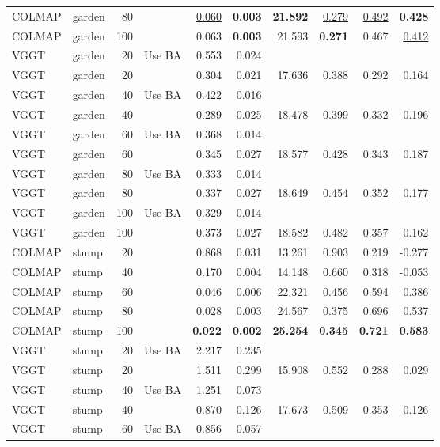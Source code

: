 \begin{table}[H]
\begin{tabular}{llrlrrrrrr}
COLMAP & garden & 80 &  & \underline{0.060} & \textbf{0.003} & \textbf{21.892} & \underline{0.279} & \underline{0.492} & \textbf{0.428} \\
COLMAP & garden & 100 &  & 0.063 & \textbf{0.003} & 21.593 & \textbf{0.271} & 0.467 & \underline{0.412} \\
VGGT & garden & 20 & Use BA & 0.553 & 0.024 &  &  &  &  \\
VGGT & garden & 20 &  & 0.304 & 0.021 & 17.636 & 0.388 & 0.292 & 0.164 \\
VGGT & garden & 40 & Use BA & 0.422 & 0.016 &  &  &  &  \\
VGGT & garden & 40 &  & 0.289 & 0.025 & 18.478 & 0.399 & 0.332 & 0.196 \\
VGGT & garden & 60 & Use BA & 0.368 & 0.014 &  &  &  &  \\
VGGT & garden & 60 &  & 0.345 & 0.027 & 18.577 & 0.428 & 0.343 & 0.187 \\
VGGT & garden & 80 & Use BA & 0.333 & 0.014 &  &  &  &  \\
VGGT & garden & 80 &  & 0.337 & 0.027 & 18.649 & 0.454 & 0.352 & 0.177 \\
VGGT & garden & 100 & Use BA & 0.329 & 0.014 &  &  &  &  \\
VGGT & garden & 100 &  & 0.373 & 0.027 & 18.582 & 0.482 & 0.357 & 0.162 \\
\midrule
COLMAP & stump & 20 &  & 0.868 & 0.031 & 13.261 & 0.903 & 0.219 & -0.277 \\
COLMAP & stump & 40 &  & 0.170 & 0.004 & 14.148 & 0.660 & 0.318 & -0.053 \\
COLMAP & stump & 60 &  & 0.046 & 0.006 & 22.321 & 0.456 & 0.594 & 0.386 \\
COLMAP & stump & 80 &  & \underline{0.028} & \underline{0.003} & \underline{24.567} & \underline{0.375} & \underline{0.696} & \underline{0.537} \\
COLMAP & stump & 100 &  & \textbf{0.022} & \textbf{0.002} & \textbf{25.254} & \textbf{0.345} & \textbf{0.721} & \textbf{0.583} \\
VGGT & stump & 20 & Use BA & 2.217 & 0.235 &  &  &  &  \\
VGGT & stump & 20 &  & 1.511 & 0.299 & 15.908 & 0.552 & 0.288 & 0.029 \\
VGGT & stump & 40 & Use BA & 1.251 & 0.073 &  &  &  &  \\
VGGT & stump & 40 &  & 0.870 & 0.126 & 17.673 & 0.509 & 0.353 & 0.126 \\
VGGT & stump & 60 & Use BA & 0.856 & 0.057 &  &  &  &  \\

\end{tabular}
\end{table}
